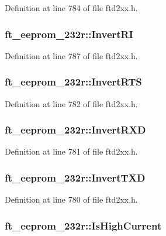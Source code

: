 Definition at line 784 of file ftd2xx.h.\hypertarget{structft__eeprom__232r_a1f9d1fbebcbc86c8a27d2abf6b9169f7}{
\subsubsection[{InvertRI}]{ {\bf ft\_\-eeprom\_\-232r::InvertRI}}}
\label{structft__eeprom__232r_a1f9d1fbebcbc86c8a27d2abf6b9169f7}


Definition at line 787 of file ftd2xx.h.\hypertarget{structft__eeprom__232r_accb739bb2d2c81f31cb9e7e634d15e7c}{
\subsubsection[{InvertRTS}]{ {\bf ft\_\-eeprom\_\-232r::InvertRTS}}}
\label{structft__eeprom__232r_accb739bb2d2c81f31cb9e7e634d15e7c}


Definition at line 782 of file ftd2xx.h.\hypertarget{structft__eeprom__232r_afbb26654eac5fa6266726e42f26ed317}{
\subsubsection[{InvertRXD}]{ {\bf ft\_\-eeprom\_\-232r::InvertRXD}}}
\label{structft__eeprom__232r_afbb26654eac5fa6266726e42f26ed317}


Definition at line 781 of file ftd2xx.h.\hypertarget{structft__eeprom__232r_ae284d5a2e53c8e77dcbdd7789734b8f0}{
\subsubsection[{InvertTXD}]{ {\bf ft\_\-eeprom\_\-232r::InvertTXD}}}
\label{structft__eeprom__232r_ae284d5a2e53c8e77dcbdd7789734b8f0}


Definition at line 780 of file ftd2xx.h.\hypertarget{structft__eeprom__232r_abd8a4afecd3fa431c7654d14886395dd}{
\subsubsection[{IsHighCurrent}]{ {\bf ft\_\-eeprom\_\-232r::IsHighCurrent}}}
\label{structft__eeprom__232r_abd8a4afecd3fa431c7654d14886395dd}


